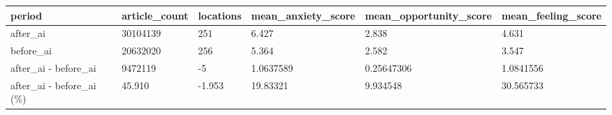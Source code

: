 \begin{tabular}{llllll}
\toprule
period & article\_count & locations & mean\_anxiety\_score & mean\_opportunity\_score & mean\_feeling\_score \\
\midrule
after\_ai & 30104139 & 251 & 6.427 & 2.838 & 4.631 \\
before\_ai & 20632020 & 256 & 5.364 & 2.582 & 3.547 \\
after\_ai - before\_ai & 9472119 & -5 & 1.0637589 & 0.25647306 & 1.0841556 \\
after\_ai - before\_ai (\%) & 45.910 & -1.953 & 19.83321 & 9.934548 & 30.565733 \\
\bottomrule
\end{tabular}
